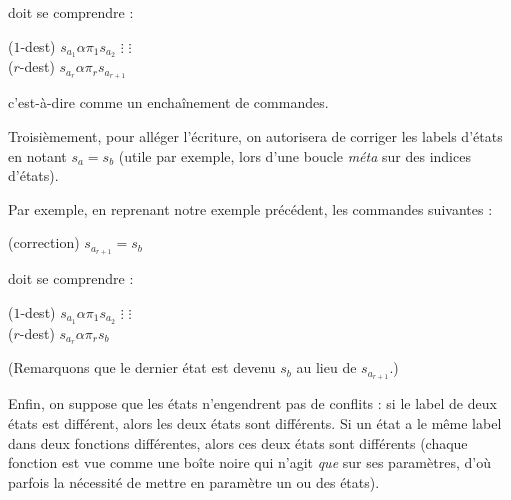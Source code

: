 \documentclass{report}
\begin{document}
\begin{appendices}
					\espace
					
					doit se comprendre :
					
					\espace
					
					\begin{algorithm}[H]
						($1$-dest) 	$s_{a_1} \alpha \pi_1 s_{a_{2}}$\;
						$\vdots$		\hspace{1cm} $\vdots$ \\
						($r$-dest) 	$s_{a_r} \alpha \pi_r s_{a_{r+1}}$\;
					\end{algorithm}
					
					\espace
					
					c'est-à-dire comme un enchaînement de commandes. 
					
					
					Troisièmement, pour alléger l'écriture, on autorisera de corriger les labels d'états en notant $s_a = s_b$ (utile par exemple, lors d'une boucle \emph{méta} sur des indices d'états).
					
					Par exemple, en reprenant notre exemple précédent, les commandes suivantes :
					
					\espace
					
					\begin{algorithm}[H]
						(correction)		$s_{a_{r+1}} = s_b$
					\end{algorithm}
					
					\espace
					
					doit se comprendre :
					
					\espace
					
					\begin{algorithm}[H]
						($1$-dest) 	$s_{a_1} \alpha \pi_1 s_{a_{2}}$\;
						$\vdots$		\hspace{1cm} $\vdots$ \\
						($r$-dest) 	$s_{a_r} \alpha \pi_r s_{b}$\;
					\end{algorithm}
					
					\espace
					
					(Remarquons que le dernier état est devenu $s_b$ au lieu de $s_{a_{r+1}}$.)
					
					
					\espace
					
					
					Enfin, on suppose que les états n'engendrent pas de conflits : si le label de deux états est différent, alors les deux états sont différents. Si un état a le même label dans deux fonctions différentes, alors ces deux états sont différents (chaque fonction est vue comme une boîte noire qui n'agit \emph{que} sur ses paramètres, d'où parfois la nécessité de mettre en paramètre un ou des états).
				

\end{appendices}
\end{document}
